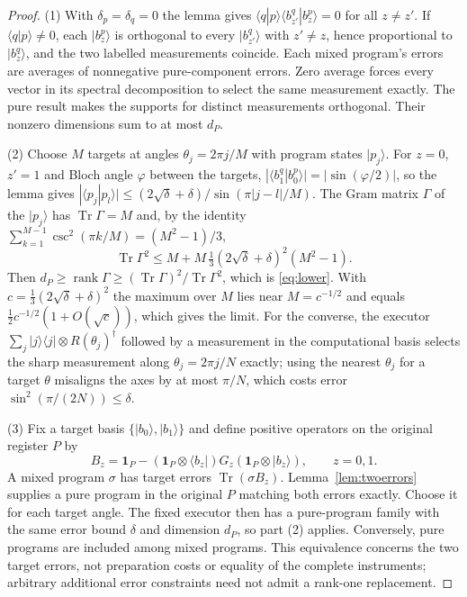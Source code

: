 \documentclass[12pt,a4paper]{article}
\newcommand{\ket}[1]{|#1\rangle}
\newcommand{\bra}[1]{\langle #1|}
\newcommand{\proj}[1]{|#1\rangle\!\langle #1|}
\newcommand{\Tr}{\operatorname{Tr}}
\begin{document}
\begin{proof}
(1) With $\delta_p=\delta_q=0$ the lemma gives $\langle q|p\rangle\langle b^q_{z'}|b^p_z\rangle=0$ for all $z\ne z'$. If $\langle q|p\rangle\ne0$, each $\ket{b^p_z}$ is orthogonal to every $\ket{b^q_{z'}}$ with $z'\ne z$, hence proportional to $\ket{b^q_z}$, and the two labelled measurements coincide. Each mixed program's errors are averages of nonnegative pure-component errors. Zero average forces every vector in its spectral decomposition to select the same measurement exactly. The pure result makes the supports for distinct measurements orthogonal. Their nonzero dimensions sum to at most $d_P$.

(2) Choose $M$ targets at angles $\theta_j=2\pi j/M$ with program states $\ket{p_j}$. For $z=0$, $z'=1$ and Bloch angle $\varphi$ between the targets, $|\langle b^{q}_{1}|b^{p}_0\rangle|=|\sin(\varphi/2)|$, so the lemma gives $|\langle p_j|p_l\rangle|\le(2\sqrt\delta+\delta)/\sin(\pi|j-l|/M)$. The Gram matrix $\Gamma$ of the $\ket{p_j}$ has $\Tr\Gamma=M$ and, by the identity $\sum_{k=1}^{M-1}\csc^2(\pi k/M)=(M^2-1)/3$,
\[
\Tr\Gamma^2\le M+M\,\tfrac13(2\sqrt\delta+\delta)^2(M^2-1).
\]
Then $d_P\ge\operatorname{rank}\Gamma\ge(\Tr\Gamma)^2/\Tr\Gamma^2$, which is \eqref{eq:lower}. With $c=\frac13(2\sqrt\delta+\delta)^2$ the maximum over $M$ lies near $M=c^{-1/2}$ and equals $\frac12c^{-1/2}(1+O(\sqrt c))$, which gives the limit. For the converse, the executor $\sum_j\proj j\otimes R(\theta_j)^\dagger$ followed by a measurement in the computational basis selects the sharp measurement along $\theta_j=2\pi j/N$ exactly; using the nearest $\theta_j$ for a target $\theta$ misaligns the axes by at most $\pi/N$, which costs error $\sin^2(\pi/(2N))\le\delta$.

(3) Fix a target basis $\{\ket{b_0},\ket{b_1}\}$ and define positive operators on the original register $P$ by
\[
B_z=\mathbf 1_P-(\mathbf 1_P\otimes\bra{b_z})G_z(\mathbf 1_P\otimes\ket{b_z}),\qquad z=0,1.
\]
A mixed program $\sigma$ has target errors $\Tr(\sigma B_z)$. Lemma~\ref{lem:twoerrors} supplies a pure program in the original $P$ matching both errors exactly. Choose it for each target angle. The fixed executor then has a pure-program family with the same error bound $\delta$ and dimension $d_P$, so part (2) applies. Conversely, pure programs are included among mixed programs. This equivalence concerns the two target errors, not preparation costs or equality of the complete instruments; arbitrary additional error constraints need not admit a rank-one replacement.
\end{proof}
\end{document}

